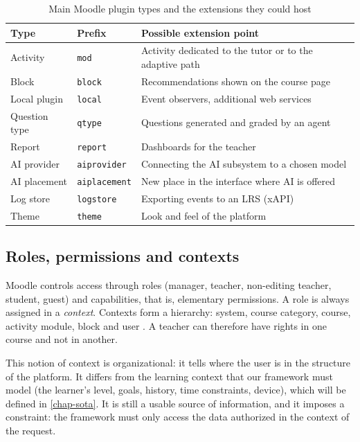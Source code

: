 \begin{table}[htbp]
\centering
\caption{Main Moodle plugin types and the extensions they could host}
\label{tab-moodle-plugins}
\small
\begin{tabularx}{\textwidth}{@{}L{2.6cm}L{2.6cm}Y@{}}
\toprule
\textbf{Type} & \textbf{Prefix} & \textbf{Possible extension point} \\
\midrule
Activity        & \texttt{mod}          & Activity dedicated to the tutor or to the adaptive path \\
Block           & \texttt{block}        & Recommendations shown on the course page \\
Local plugin    & \texttt{local}        & Event observers, additional web services \\
Question type   & \texttt{qtype}        & Questions generated and graded by an agent \\
Report          & \texttt{report}       & Dashboards for the teacher \\
AI provider     & \texttt{aiprovider}   & Connecting the AI subsystem to a chosen model \\
AI placement    & \texttt{aiplacement}  & New place in the interface where AI is offered \\
Log store       & \texttt{logstore}     & Exporting events to an LRS (xAPI) \\
Theme           & \texttt{theme}        & Look and feel of the platform \\
\bottomrule
\end{tabularx}
\end{table}

\subsection{Roles, permissions and contexts}

Moodle controls access through roles (manager, teacher, non-editing
teacher, student, guest) and capabilities, that is, elementary
permissions. A role is always assigned in a \emph{context}. Contexts form a
hierarchy: system, course category, course, activity module, block and
user \cite{moodle_contexts}. A teacher can therefore have rights in one
course and not in another.

This notion of context is organizational: it tells where the user is in
the structure of the platform. It differs from the learning context that
our framework must model (the learner's level, goals, history, time
constraints, device), which will be defined in \cref{chap-sota}. It is
still a usable source of information, and it imposes a constraint: the
framework must only access the data authorized in the context of the
request.

